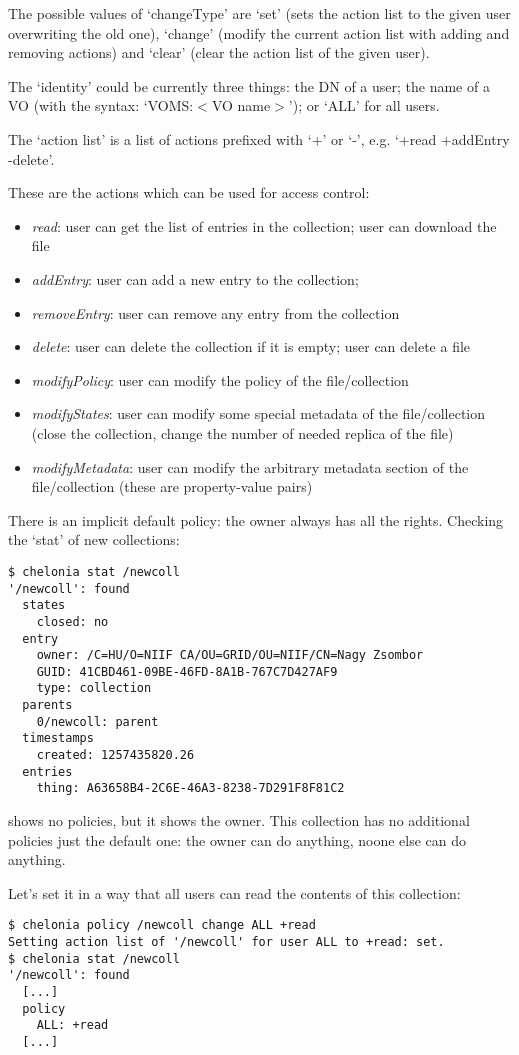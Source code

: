The possible values of `changeType' are `set' (sets the action list to the given user overwriting the old one), `change' (modify the current action list with adding and removing actions) and `clear' (clear the action list of the given user).

The `identity' could be currently three things: the DN of a user; the name of a VO (with the syntax: `VOMS:$<$VO name$>$'); or `ALL' for all users.

The `action list' is a list of actions prefixed with `+' or `-', e.g. `+read +addEntry -delete'.

These are the actions which can be used for access control:
\begin{itemize}
    \item \emph{read}: user can get the list of entries in the collection; user can download the file
    \item \emph{addEntry}: user can add a new entry to the collection;
    \item \emph{removeEntry}: user can remove any entry from the collection 
    \item \emph{delete}: user can delete the collection if it is empty; user can delete a file
    \item \emph{modifyPolicy}: user can modify the policy of the file/collection
    \item \emph{modifyStates}: user can modify some special metadata of the file/collection (close the collection, change the number of needed replica of the file)
    \item \emph{modifyMetadata}: user can modify the arbitrary metadata section of the file/collection (these are property-value pairs)
\end{itemize}

There is an implicit default policy: the owner always has all the rights.
Checking the `stat' of new collections:
\begin{verbatim}
$ chelonia stat /newcoll
'/newcoll': found
  states
    closed: no
  entry
    owner: /C=HU/O=NIIF CA/OU=GRID/OU=NIIF/CN=Nagy Zsombor
    GUID: 41CBD461-09BE-46FD-8A1B-767C7D427AF9
    type: collection
  parents
    0/newcoll: parent
  timestamps
    created: 1257435820.26
  entries
    thing: A63658B4-2C6E-46A3-8238-7D291F8F81C2
\end{verbatim}
shows no policies, but it shows the owner. This collection has no additional policies just the default one: the owner can do anything, noone else can do anything.

Let's set it in a way that all users can read the contents of this collection:
\begin{verbatim}
$ chelonia policy /newcoll change ALL +read
Setting action list of '/newcoll' for user ALL to +read: set.
$ chelonia stat /newcoll
'/newcoll': found
  [...]
  policy
    ALL: +read
  [...]
\end{verbatim}

